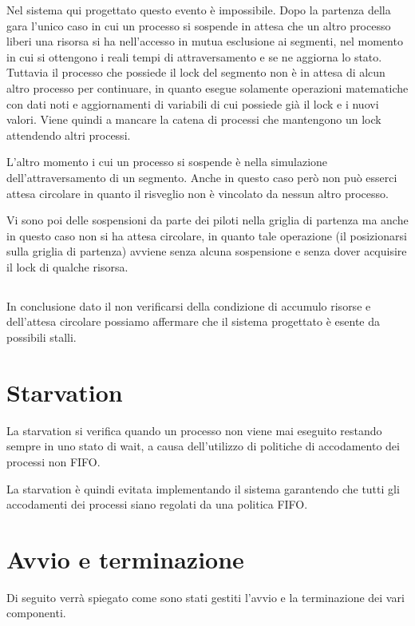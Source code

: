 \documentclass[a4paper,11pt, twoside, openright]{book}
\begin{document}
        Nel sistema qui progettato questo evento è impossibile. Dopo la partenza della gara l'unico caso in cui un processo
	si sospende in attesa che un altro processo liberi una risorsa si ha nell'accesso in mutua esclusione
	ai segmenti, nel momento in cui si ottengono i reali tempi di attraversamento e se ne aggiorna lo stato.
	Tuttavia il processo che possiede il lock del segmento non è in attesa di alcun altro processo per continuare,
	in quanto esegue solamente operazioni matematiche con dati noti e aggiornamenti di variabili di cui possiede già il lock e
	i nuovi valori. Viene quindi a mancare la catena di processi che mantengono un lock attendendo altri processi.
	
	L'altro momento i cui un processo si sospende è nella simulazione dell'attraversamento di un segmento. Anche in
	questo caso però non può esserci attesa circolare in quanto il risveglio non è vincolato da nessun altro processo.
	
	Vi sono poi delle sospensioni da parte dei piloti nella griglia di partenza ma anche in questo caso
	non si ha attesa circolare, in quanto tale operazione (il posizionarsi sulla griglia di partenza)
	avviene senza alcuna sospensione e senza dover acquisire il lock di qualche risorsa.
	      
      \subsection*{}
	In conclusione dato il non verificarsi della condizione di accumulo risorse e dell'attesa circolare
	possiamo affermare che il sistema
	progettato è esente da possibili stalli.    
    
    \section{Starvation}
      La starvation si verifica quando un processo non viene mai eseguito restando sempre in uno stato di wait,
      a causa dell'utilizzo di politiche di accodamento dei processi non FIFO.
      
      La starvation è quindi evitata implementando il sistema garantendo 
      che tutti gli accodamenti dei processi siano regolati da una politica FIFO.
    
    \section{Avvio e terminazione}
      Di seguito verrà spiegato come sono stati gestiti l'avvio e la terminazione dei vari componenti.
      
\end{document}
